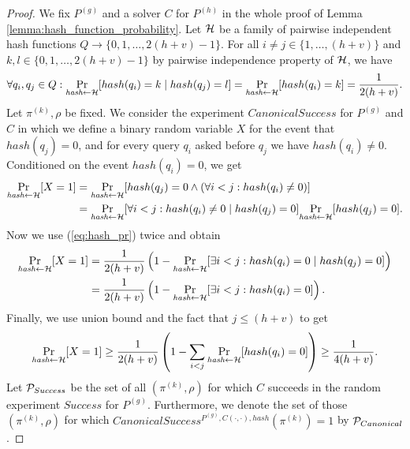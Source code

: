 \begin{proof}
We fix $P^{(g)}$ and a solver $C$ for $P^{(h)}$ in the whole proof of Lemma \ref{lemma:hash_function_probability}.
Let $\mathcal{H}$ be a family of pairwise independent hash functions $Q \rightarrow \{0,1, \dots,2(h+v)-1\}$.
For all $i \neq j \in \{1, \dots, (h+v)\}$ and $k,l \in \{0,1,\dots,2(h+v)-1\}$ by pairwise independence property of $\mathcal{H}$,
we have
\begin{align}
  \label{eq:hash_pr}
 \forall q_i,q_j \in Q : \underset{\textit{hash} \leftarrow \mathcal{H}}{\Pr}[hash(q_i) = k \mid hash(q_j) = l] = \underset{\textit{hash} \leftarrow \mathcal{H}}{\Pr}[hash(q_i) = k] = \frac{1}{2(h+v)}.
\end{align}
Let $\pi^{(k)}, \rho$ be fixed. We consider the experiment $CanonicalSuccess$ for $P^{(g)}$ and $C$
in which we define a binary random variable $X$ for the event that $hash(q_j) = 0$, and for every query $q_i$ asked before $q_j$ we have $hash(q_i) \neq 0$.
Conditioned on the event $hash(q_i) = 0$, we get
\begin{align*}
  \underset{\textit{hash} \leftarrow \mathcal{H}}{\Pr}[X=1] &= \underset{\textit{hash} \leftarrow \mathcal{H}}{\Pr}[hash(q_j) = 0 \land (\forall i < j : hash(q_i) \neq 0)] \\
  &=\underset{\textit{hash} \leftarrow \mathcal{H}}{\Pr}[\forall i < j : hash(q_i) \neq 0 \mid hash(q_j) = 0] \underset{\textit{hash} \leftarrow \mathcal{H}}{\Pr}[hash(q_j) = 0].
\end{align*}
Now we use (\ref{eq:hash_pr}) twice and obtain
\begin{align*}
\underset{\textit{hash} \leftarrow \mathcal{H}}{\Pr}[X=1] &=
\frac{1}{2(h+v)}\left(1 -\underset{\textit{hash} \leftarrow \mathcal{H}}{\Pr}[\exists i < j : hash(q_i) = 0 \mid hash(q_j) = 0] \right) \\
 &= \frac{1}{2(h+v)} \left( 1 -\underset{\textit{hash} \leftarrow \mathcal{H}}{\Pr}[\exists i < j : hash(q_i) = 0] \right).
\end{align*}
Finally, we use union bound and the fact that $j \leq (h+v)$ to get
\begin{align*}
\underset{\textit{hash} \leftarrow \mathcal{H}}{\Pr}[X=1] \geq
\frac{1}{2(h+v)} \left( 1 - \sum_{i < j} \underset{\textit{hash} \leftarrow \mathcal{H}}{\Pr}[hash(q_i) = 0] \right) \geq \frac{1}{4(h+v)}.
\end{align*}
Let $\mathcal{P}_{Success}$ be the set of all $(\pi^{(k)},\rho)$ for which $C$ succeeds in the random experiment $Success$ for $P^{(g)}$. Furthermore,
we denote the set of those $(\pi^{(k)},\rho)$ for which $CanonicalSuccess^{P^{(g)}, C(\cdot, \cdot), hash}(\pi^{(k)}) = 1$ by $\mathcal{P}_{Canonical}$.

\end{proof}
